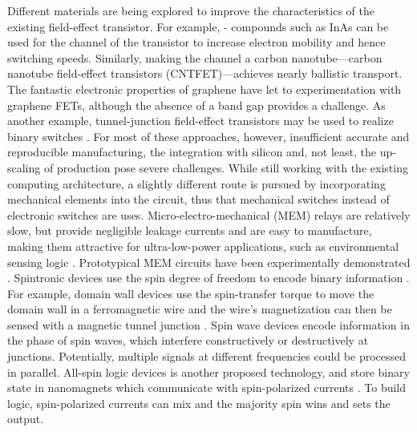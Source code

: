 Different materials are being explored to improve the characteristics of the
existing field-effect transistor. For example, {}-{} compounds such as InAs can be used for the channel of the transistor to
increase electron mobility and hence switching speeds. Similarly, making the
channel a carbon nanotube---carbon nanotube field-effect transistors
(CNTFET)---achieves nearly ballistic transport. The fantastic electronic
properties of graphene have let to experimentation with graphene FETs, although
the absence of a band gap provides a challenge. As another example,
tunnel-junction field-effect transistors may be used to realize binary switches
\cite{nikonov2013overview} \cite{cavin2012science}.
For most of these approaches, however, insufficient accurate and reproducible
manufacturing, the integration with silicon and, not least, the up-scaling of
production pose severe challenges. While still working with the existing
computing architecture, a slightly different route is pursued by incorporating
mechanical elements into the circuit, thus that mechanical switches instead of
electronic switches are uses. Micro-electro-mechanical (MEM) relays are
relatively slow, but provide negligible leakage currents and are easy to
manufacture, making them attractive for ultra-low-power applications, such as
environmental sensing logic \cite{kam2011design}. Prototypical MEM circuits have been experimentally
demonstrated \cite{spencer2011demonstration}. Spintronic devices use the spin degree of freedom to encode binary
information \cite{wolf2001spintronics}. For example, domain wall devices use the spin-transfer torque to
move the domain wall in a ferromagnetic wire and the wire's magnetization can
then be sensed with a magnetic tunnel junction \cite{allwood2005magnetic}. Spin wave devices encode
information in the phase of spin waves, which interfere constructively or
destructively at junctions. Potentially, multiple signals at different
frequencies could be processed in parallel. All-spin logic devices is another
proposed technology, and store binary state in nanomagnets which communicate
with spin-polarized currents \cite{behin2010proposal}. To build logic, spin-polarized currents can mix
and the majority spin wins and sets the output.

